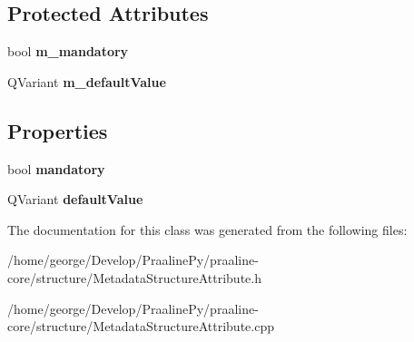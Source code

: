 \subsection*{Protected Attributes}
\begin{DoxyCompactItemize}
\item 
\mbox{\label{class_metadata_structure_attribute_ac8c945ce58dc460f742000ff8bc4cf5e}} 
bool {\bfseries m\+\_\+mandatory}
\item 
\mbox{\label{class_metadata_structure_attribute_a4dfafe7075d60db02a36ea47610b42c4}} 
Q\+Variant {\bfseries m\+\_\+default\+Value}
\end{DoxyCompactItemize}
\subsection*{Properties}
\begin{DoxyCompactItemize}
\item 
\mbox{\label{class_metadata_structure_attribute_a50b711b0a08fa9ec85170d88148c2ae9}} 
bool {\bfseries mandatory}
\item 
\mbox{\label{class_metadata_structure_attribute_aabf312124ca17f3fc63a5cb257af4853}} 
Q\+Variant {\bfseries default\+Value}
\end{DoxyCompactItemize}


The documentation for this class was generated from the following files\+:\begin{DoxyCompactItemize}
\item 
/home/george/\+Develop/\+Praaline\+Py/praaline-\/core/structure/Metadata\+Structure\+Attribute.\+h\item 
/home/george/\+Develop/\+Praaline\+Py/praaline-\/core/structure/Metadata\+Structure\+Attribute.\+cpp\end{DoxyCompactItemize}
